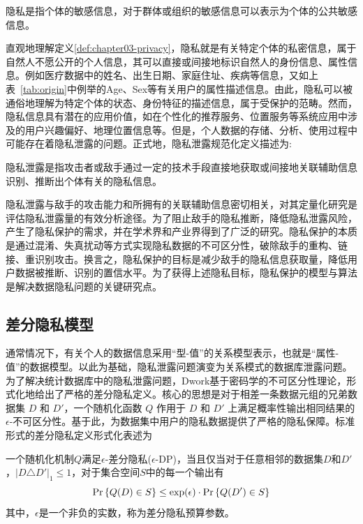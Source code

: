 \begin{definition}\label{def:chapter03-privacy}隐私是指个体的敏感信息，对于群体或组织的敏感信息可以表示为个体的公共敏感信息。
\end{definition}
直观地理解定义\ref{def:chapter03-privacy}，隐私就是有关特定个体的私密信息，属于自然人不愿公开的个人信息，其可以直接或间接地标识自然人的身份信息、属性信息。例如医疗数据中的姓名、出生日期、家庭住址、疾病等信息，又如上表~\ref{tab:origin}中例举的Age、Sex等有关用户的属性描述信息。由此，隐私可以被通俗地理解为特定个体的状态、身份特征的描述信息，属于受保护的范畴。然而，隐私信息具有潜在的应用价值，如在个性化的推荐服务、位置服务等系统应用中涉及的用户兴趣偏好、地理位置信息等。但是，个人数据的存储、分析、使用过程中可能存在着隐私泄露的问题。正式地，隐私泄露规范化定义描述为:


\begin{definition}\label{def:chapter03-privacy_leakage}隐私泄露是指攻击者或敌手通过一定的技术手段直接地获取或间接地关联辅助信息识别、推断出个体有关的隐私信息。
\end{definition}
隐私泄露与敌手的攻击能力和所拥有的关联辅助信息密切相关，对其定量化研究是评估隐私泄露量的有效分析途径。为了阻止敌手的隐私推断，降低隐私泄露风险，产生了隐私保护的需求，并在学术界和产业界得到了广泛的研究。隐私保护的本质是通过混淆、失真扰动等方式实现隐私数据的不可区分性，破除敌手的重构、链接、重识别攻击。换言之，隐私保护的目标是减少敌手的隐私信息获取量，降低用户数据被推断、识别的置信水平。为了获得上述隐私目标，隐私保护的模型与算法是解决数据隐私问题的关键研究点。

\subsection{差分隐私模型}
通常情况下，有关个人的数据信息采用``型-值''的关系模型表示，也就是``属性-值''的数据模型。以此为基础，隐私泄露问题演变为关系模式的数据库泄露问题。为了解决统计数据库中的隐私泄露问题，Dwork\cite{dwork2006calibrating,dwork2006differential,dwork2014algorithmic,dwork2015the}基于密码学的不可区分性理论，形式化地给出了严格的差分隐私定义。核心的思想是对于相差一条数据元组的兄弟数据集 $D$ 和 $D'$，一个随机化函数 $Q$ 作用于 $D$ 和 $D'$ 上满足概率性输出相同结果的$\epsilon$-不可区分性。基于此，为数据集中用户的隐私数据提供了严格的隐私保障。标准形式的差分隐私定义形式化表述为
\begin{definition}\label{def:dp}一个随机化机制$Q$满足$\epsilon$-差分隐私($\epsilon$-DP)，当且仅当对于任意相邻的数据集$D$和$D'$，$|D\triangle D'|_1\leq 1$，对于集合空间$S$中的每一个输出有
	\begin{equation}
		{\rm Pr}\left\{Q(D)\in S\right\} \leq  \exp(\epsilon)\cdot {\rm Pr}\left\{Q(D')\in S\right\}
	\end{equation}
其中，$\epsilon$是一个非负的实数，称为差分隐私预算参数。
\end{definition}

